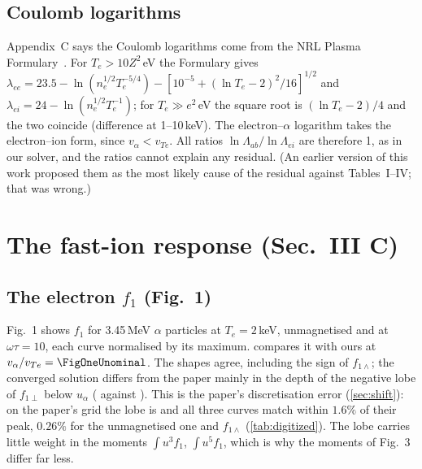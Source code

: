 \documentclass[11pt,a4paper]{article}
\newcommand{\ot}{\omega\tau}
\begin{document}
\subsection{Coulomb logarithms}\label{sec:lnl}
Appendix~C says the Coulomb logarithms come from the NRL Plasma Formulary~\cite{nrl}. For $T_e>10Z^2$\,eV the Formulary
gives $\lambda_{ee}=23.5-\ln(n_e^{1/2}T_e^{-5/4})-[10^{-5}+(\ln T_e-2)^2/16]^{1/2}$ and
$\lambda_{ei}=24-\ln(n_e^{1/2}T_e^{-1})$; for $T_e\gg e^2$\,eV the square root is $(\ln T_e-2)/4$ and the two coincide
(difference \NrlDiff{} at 1--10\,keV). The electron--$\alpha$ logarithm takes the electron--ion form, since
$v_\alpha<v_{Te}$. All ratios $\ln\Lambda_{ab}/\ln\Lambda_{ei}$ are therefore 1, as in our solver, and the ratios cannot
explain any residual. (An earlier version of this work proposed them as the most likely cause of the residual against
Tables~I--IV; that was wrong.)

\section{The fast-ion response (Sec.~III C)}\label{sec:response}
\subsection{The electron $f_1$ (Fig.~1)}\label{sec:fig1}
Fig.~1 shows $f_1$ for 3.45\,MeV $\alpha$ particles at $T_e=2$\,keV, unmagnetised and at $\ot=10$, each curve normalised by
its maximum.  compares it with ours at $v_\alpha/v_{Te}=\FigOneUnominal$. The shapes agree, including the sign
of $f_{1\wedge}$; the converged solution differs from the paper mainly in the depth of the negative lobe of $f_{1\perp}$
below $u_\alpha$ (\FigOneMinOurs{} against \FigOneMinPaper). This is the paper's discretisation error
(\cref{sec:shift}): on the paper's grid the lobe is \FigOneMinGrid{} and all three curves match within $1.6\%$ of their
peak, $0.26\%$ for the unmagnetised one and $f_{1\wedge}$ (\cref{tab:digitized}). The lobe carries little weight in the
moments $\int u^3f_1$, $\int u^5f_1$, which is why the moments of Fig.~3 differ far less.
\end{document}
